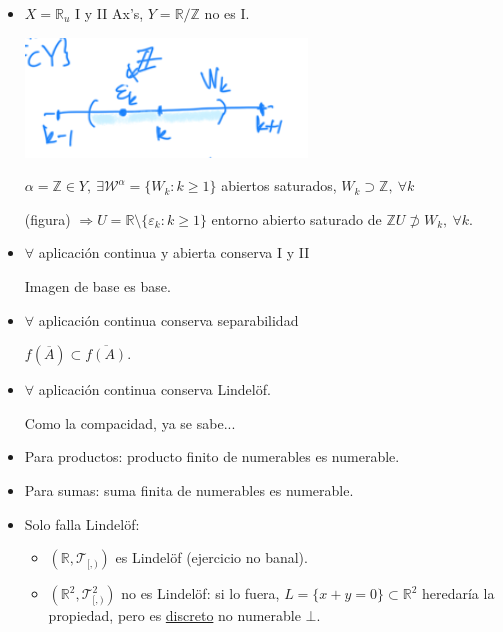 \begin{itemize}
    \item $X = \mathbb{R}_u$ I y II Ax's, $Y = \mathbb{R}/\mathbb{Z}$ no es I.
    \begin{center}
        \includegraphics[scale=0.3]{images/ej_axiomas_num_real} 
    \end{center}
    \begin{demo}
        $\alpha = \mathbb{Z} \in Y,\ \exists \mathcal{W}^{\alpha} = \{W_k : k \ge 1\}$ abiertos saturados, $W_k \supset \mathbb{Z},\ \forall k$

        (figura) $\Rightarrow U = \mathbb{R} \setminus \{\varepsilon_k : k \ge 1\}$ entorno abierto saturado de $\mathbb{Z} U \not \supset W_k,\ \forall k$.
    \end{demo}

    \item $\forall$ aplicación continua y abierta conserva I y II 
    \begin{demo}
        Imagen de base es base.
    \end{demo}
    \item $\forall $ aplicación continua conserva separabilidad 
    \begin{demo}
        $f\left( \overline{A} \right) \subset \overline{f\left( A \right)}$.
    \end{demo}
    \item $\forall$ aplicación continua conserva Lindelöf. 
    \begin{demo}
        Como la compacidad, ya se sabe...
    \end{demo}
\end{itemize}

\begin{itemize}
    \item Para productos: producto finito de numerables es numerable.
    \item Para sumas: suma finita de numerables es numerable.
    \item Solo falla Lindelöf:
    \begin{itemize}
        \item $\left( \mathbb{R}, \mathcal{T}_{[, )} \right)$ es Lindelöf (ejercicio no banal).
        \item $\left( \mathbb{R}^2, \mathcal{T}_{[, )}^2 \right)$ no es Lindelöf: si lo fuera, $L = \{x + y = 0\} \subset \mathbb{R}^2$ heredaría la propiedad, pero es \underline{discreto} no numerable $\bot$.
    \end{itemize}
\end{itemize}
